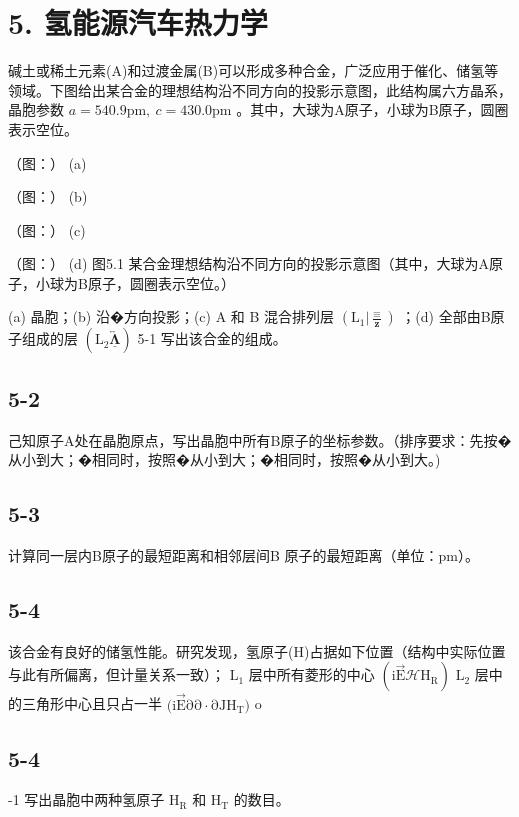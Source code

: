 \section*{5. 氢能源汽车热力学}
碱⼟或稀⼟元素(A)和过渡⾦属(B)可以形成多种合⾦，⼴泛应⽤于催化、储氢等领域。下图给出某合⾦的理想结构沿不同⽅向的投影⽰意图，此结构属六⽅晶系，晶胞参数 $\displaystyle a = 5 4 0 . 9 \mathrm { p m } , \ c = 4 3 0 . 0 \mathrm { p m }$ 。其中，⼤球为A原⼦，⼩球为B原⼦，圆圈表⽰空位。

（图：）
(a)

（图：）
(b)

（图：）
(c)

（图：）
(d)
图5.1 某合⾦理想结构沿不同⽅向的投影⽰意图（其中，⼤球为A原⼦，⼩球为B原⼦，圆圈表⽰空位。）

(a) 晶胞；(b) 沿�⽅向投影；(c) A 和 B 混合排列层 $\left( \mathrm { L } _ { 1 } | \frac { \mathbf { \equiv } } { \mathbf { z } } \right)$ ；(d) 全部由B原⼦组成的层 $\left( \mathrm { L } _ { 2 } \overleftrightarrow { \underline { { \mathbf { \Lambda } } } } \right)$ 5-1 写出该合⾦的组成。

\subsection*{5-2}
⼰知原⼦A处在晶胞原点，写出晶胞中所有B原⼦的坐标参数。（排序要求：先按�从⼩到⼤；�相同时，按照�从⼩到⼤；�相同时，按照�从⼩到⼤。)

\subsection*{5-3}
计算同⼀层内B原⼦的最短距离和相邻层间B 原⼦的最短距离（单位：pm）。

\subsection*{5-4}
该合⾦有良好的储氢性能。研究发现，氢原⼦(H)占据如下位置（结构中实际位置与此有所偏离，但计量关系⼀致）； $\mathrm { L _ { 1 } }$ 层中所有菱形的中⼼ $( \mathrm { i } \mathrm { \vec { E } \mathcal { H } H _ { R } } )$ $\mathrm { L } _ { 2 }$ 层中的三⻆形中⼼且只占⼀半 $( \mathrm { i } \mathrm { \vec { E } \partial \mathrm { \partial \cdot \partial \mathrm { J } H _ { T } ) } }$ o

\subsection*{5-4}
-1 写出晶胞中两种氢原⼦ $\mathrm { H } _ { \mathrm { R } }$ 和 $\mathrm { H } _ { \mathrm { T } }$ 的数⽬。

